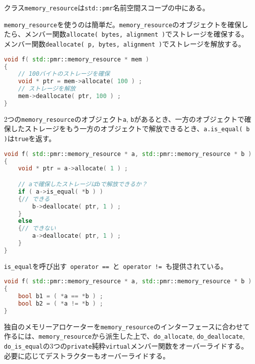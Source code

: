 クラス\lstinline!memory_resource!は\lstinline!std::pmr!名前空間スコープの中にある。

%

\lstinline!memory_resource!を使うのは簡単だ。\lstinline!memory_resource!のオブジェクトを確保したら、メンバー関数\lstinline!allocate( bytes, alignment )!でストレージを確保する。メンバー関数\lstinline!deallocate( p, bytes, alignment )!でストレージを解放する。

\begin{lstlisting}[language=C++]
void f( std::pmr::memory_resource * mem )
{
    // 100バイトのストレージを確保
    void * ptr = mem->allocate( 100 ) ;
    // ストレージを解放
    mem->deallocate( ptr, 100 ) ;
}
\end{lstlisting}

2つの\lstinline!memory_resource!のオブジェクト\lstinline!a!,
\lstinline!b!があるとき、一方のオブジェクトで確保したストレージをもう一方のオブジェクトで解放できるとき、\lstinline!a.is_equal( b )!は\lstinline!true!を返す。

\begin{lstlisting}[language=C++]
void f( std::pmr::memory_resource * a, std::pmr::memory_resource * b )
{
    void * ptr = a->allocate( 1 ) ;

    // aで確保したストレージはbで解放できるか？
    if ( a->is_equal( *b ) )
    {// できる
        b->deallocate( ptr, 1 ) ;
    }
    else
    {// できない
        a->deallocate( ptr, 1 ) ;
    }
}
\end{lstlisting}

\lstinline!is_equal!を呼び出す~\lstinline!operator ==!~と~\lstinline"operator !="~も提供されている。

\begin{lstlisting}[language=C++]
void f( std::pmr::memory_resource * a, std::pmr::memory_resource * b )
{
    bool b1 = ( *a == *b ) ;
    bool b2 = ( *a != *b ) ;
}
\end{lstlisting}

%

独自のメモリーアロケーターを\lstinline!memory_resource!のインターフェースに合わせて作るには、\lstinline!memory_resource!から派生した上で、\lstinline!do_allocate!,
\lstinline!do_deallocate!,
\lstinline!do_is_equal!の3つの\lstinline!private!純粋\lstinline!virtual!メンバー関数をオーバーライドする。必要に応じてデストラクターもオーバーライドする。

